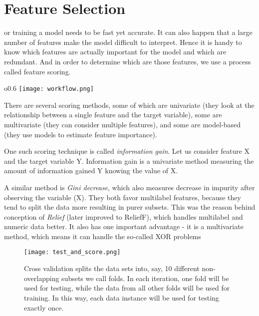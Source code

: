 \chapter{Feature Selection}

 or training a model needs to be fast yet accurate. It can also happen that a large number of features make the model difficult to interpret. Hence it is handy to know which features are actually important for the model and which are redundant. And in order to determine which are those features, we use a process called feature scoring.

\begin{wrapfigure}{o}{0.6\textwidth}
    \vspace{-0.5cm}
    \texttt{[image: workflow.png]}
\end{wrapfigure}

There are several scoring methods, some of which are univariate (they look at the relationship between a single feature and the target variable), some are multivariate (they can consider multiple features), and some are model-based (they use models to estimate feature importance). 

One such scoring technique is called \textit{information gain}. Let us consider feature X and the target variable Y. Information gain is a univariate method measuring the amount of information gained Y knowing the value of X.

A similar method is \textit{Gini decrease}, which also measures decrease in impurity after observing the variable (X). They both favor multilabel features, because they tend to split the data more resulting in purer subsets. This was the reason behind conception of \textit{Relief} (later improved to ReliefF), which handles multilabel and numeric data better. It also has one important advantage - it is a multivariate method, which means it can handle the so-called XOR problems

\begin{figure}[h]
    \centering
    \texttt{[image: test\_and\_score.png]}
    \caption{Cross validation splits the data sets into, say, 10 different non-overlapping subsets we call folds. In each iteration, one fold will be used for testing, while the data from all other folds will be used for training. In this way, each data instance will be used for testing exactly once.}
\end{figure}
